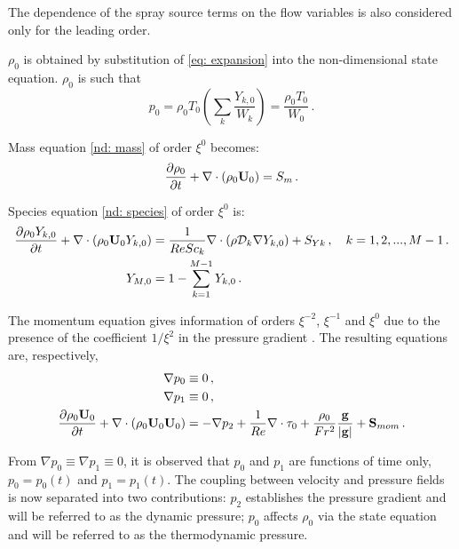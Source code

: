 The dependence of the spray source terms on the flow variables is also considered only for the leading order.

$\rho_0$ is obtained by substitution of \eqref{eq: expansion} into the
non-dimensional state equation. $\rho_0$ is such that
\begin{equation}\label{lm: state}
 p_0 = \rho_0 T_0 \left( \sum_k \frac{Y_{k,0}}{W_k} \right) =  \frac{ \rho_0
T_0}{W_0}\, .
\end{equation}

Mass equation \eqref{nd: mass} of order $\xi^0$ becomes:
\begin{equation}
 \frac{\partial \rho_0}{\partial t} + \nabla \cdot \left( \rho_0 \mathbf{U}_0
\right) =  S_m \, .
\end{equation}

Species equation \eqref{nd: species} of order $\xi^0$ is:
\begin{subequations}\label{lm: species}
\begin{align}
 \frac{\partial \rho_0 Y_{k,0} }{\partial t} + \nabla \cdot\left(\rho_0 \mathbf{U}_0
Y_{k,0} \right) &= \frac{1}{Re Sc_k} \nabla \cdot \left( \rho \mathcal{D}_k
\nabla Y_{k,0} \right) +S_{Yk} \, , \quad k=1,2,...,M-1 \, . \\
  Y_{M,0} &= 1- \sum_{k=1}^{M-1} Y_{k,0} \, .
\end{align}
\end{subequations}

The momentum equation gives information of orders $\xi^{-2}$, $\xi^{-1}$ and
$\xi^0$ due to the presence of the coefficient $1/\xi^2$ in the pressure gradient . The
resulting equations are, respectively,
\begin{subequations}\label{lm: momentum}
\begin{align}
 \nabla p_0 &\equiv 0 \, , \\
 \nabla p_1 &\equiv 0 \, , \\
 \frac{\partial \rho_0 \mathbf{U}_0 }{\partial t} + \nabla \cdot \left( \rho_0
\mathbf{U}_0 \mathbf{U}_0 \right) &= -\nabla p_2 + \frac{1}{Re} \nabla \cdot \mathbf{\tau}_0
+\frac{\rho_0}{Fr^2} \frac{\mathbf{g}}{|\mathbf{g}|}+\mathbf{S}_{mom}  \, .
\end{align}
\end{subequations}

From $\nabla p_0 \equiv \nabla p_1 \equiv 0$, it is observed that $p_0$ and
$p_1$ are functions of time only, $p_0 = p_0 (t)$ and $p_1 = p_1 (t)$. The
coupling between  velocity and pressure fields is now separated into two
contributions:  $p_2$ establishes the pressure gradient and will be referred to
as the dynamic pressure; $p_0$ affects $\rho_0$ via the state equation and will
be referred to as the thermodynamic pressure. 

